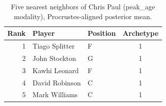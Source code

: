\begin{table}[htbp]
  \centering\small
  \begin{tabular}{rllc}
    \toprule
    Rank & Player & Position & Archetype \\
    \midrule
    1 & Tiago Splitter & F & 1 \\
    2 & John Stockton & G & 1 \\
    3 & Kawhi Leonard & F & 1 \\
    4 & David Robinson & C & 1 \\
    5 & Mark Williams & C & 1 \\
    \bottomrule
  \end{tabular}
  \caption{Five nearest neighbors of Chris Paul (peak_age modality), Procrustes-aligned posterior mean.}
  \label{tab:Chris_Paul_neighbors_peak_age}
\end{table}


